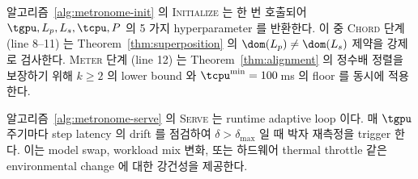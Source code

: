 알고리즘~\ref{alg:metronome-init} 의 \textsc{Initialize} 는 한 번 호출되어 $\tgpu, L_p, L_s, \tcpu, P$ 의 5 가지 hyperparameter 를 반환한다.
이 중 \textsc{Chord} 단계 (line 8--11) 는 Theorem~\ref{thm:superposition} 의 $\dom(L_p) \neq \dom(L_s)$ 제약을 강제로 검사한다.
\textsc{Meter} 단계 (line 12) 는 Theorem~\ref{thm:alignment} 의 정수배 정렬을 보장하기 위해 $k \geq 2$ 의 lower bound 와 $\tcpu^{\min} = 100$\,ms 의 floor 를 동시에 적용한다.

알고리즘~\ref{alg:metronome-serve} 의 \textsc{Serve} 는 runtime adaptive loop 이다.
매 $\tgpu$ 주기마다 step latency 의 drift 를 점검하여 $\delta > \delta_{\max}$ 일 때 박자 재측정을 trigger 한다.
이는 model swap, workload mix 변화, 또는 하드웨어 thermal throttle 같은 environmental change 에 대한 강건성을 제공한다.
